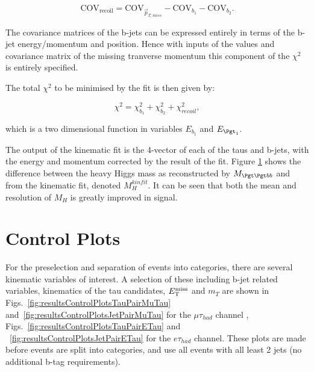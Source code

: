 \begin{equation}
\text{COV}_{\text{recoil}} = \text{COV}_{\vec{p}_{T,miss}} - \text{COV}_{b_{1}} -
\text{COV}_{b_{2}} .
\end{equation}

The covariance matrices of the b-jets can be expressed entirely in terms of the
b-jet energy/momentum and position. Hence with inputs of the values and
covariance matrix of the missing tranverse momentum this component of the
$\chi^{2}$ is entirely specified. 

The total $\chi^{2}$ to be minimised by the fit is then given by:

\begin{equation}
\chi^{2}= \chi_{b_{1}}^{2} + \chi_{b_{2}}^{2} + \chi_{recoil}^{2},
\end{equation}

which is a two dimensional function in variables $E_{b_{1}}$ and $E_{\Pgt_{1}}$.

The output of the kinematic fit is the 4-vector of each of the taus and b-jets,
with the energy and momentum corrected by the result of the fit. Figure \ref{}
shows the difference between the heavy Higgs mass as reconstructed by
$M_{\Pgt\Pgt bb}$ and from the kinematic fit, denoted $M_{H}^{kinfit}$. It can
be seen that both the mean and resolution of $M_{H}$ is greatly improved in
signal.

\section{Control Plots}

For the preselection and separation of events into categories, there are several
kinematic variables of interest. A selection of these including b-jet related
variables, kinematics of the tau candidates, $E_{\mathrm{T}}^{\text{miss}}$ and $m_{T}$ are shown in
Figs.~\ref{fig:resultsControlPlotsTauPairMuTau}
and~\ref{fig:resultsControlPlotsJetPairMuTau} for the $\mu\tau_{had}$ channel
, Figs.~\ref{fig:resultsControlPlotsTauPairETau} and
~\ref{fig:resultsControlPlotsJetPairETau} for the $e\tau_{had}$ channel.
These plots are made before events are split into categories, and use all events
with all least 2 jets (no additional b-tag requirements).


